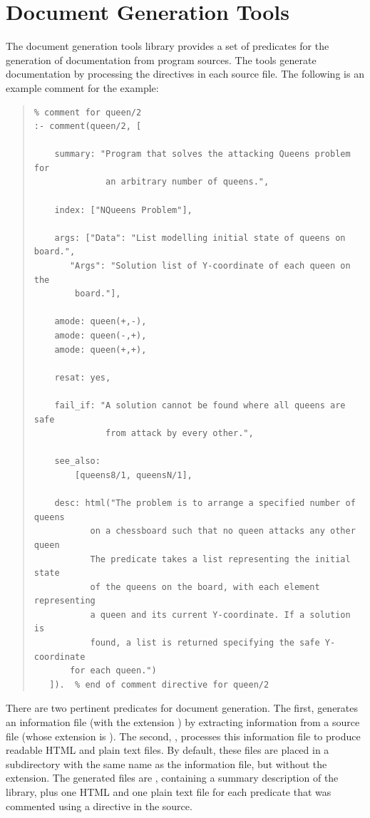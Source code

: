 \section{Document Generation Tools}

The document generation tools library provides a set of predicates for
the generation of documentation from \eclipse{} program sources. The
tools generate documentation by processing the
directives in each source file. The following is an example comment for
the  example:

\begin{quote}
\begin{verbatim}
% comment for queen/2
:- comment(queen/2, [

    summary: "Program that solves the attacking Queens problem for
              an arbitrary number of queens.",

    index: ["NQueens Problem"],

    args: ["Data": "List modelling initial state of queens on board.",
       "Args": "Solution list of Y-coordinate of each queen on the
        board."],

    amode: queen(+,-),
    amode: queen(-,+),
    amode: queen(+,+),

    resat: yes,

    fail_if: "A solution cannot be found where all queens are safe
              from attack by every other.",

    see_also:
        [queens8/1, queensN/1],

    desc: html("The problem is to arrange a specified number of queens
           on a chessboard such that no queen attacks any other queen
           The predicate takes a list representing the initial state
           of the queens on the board, with each element representing
           a queen and its current Y-coordinate. If a solution is
           found, a list is returned specifying the safe Y-coordinate
	   for each queen.")
   ]).  % end of comment directive for queen/2
\end{verbatim}
\end{quote}

There are two pertinent predicates for document generation. The first,
 generates an
information file (with the extension ) by extracting information
from a source file (whose extension is ).
The second,
,
processes this information file to produce readable HTML and plain text files.
By default, these files are placed in a subdirectory with the
same name as the information file, but without the extension.
The generated files are , containing a summary
description of the library, plus one HTML and one plain text file
for each predicate that was commented using a  directive
in the source.


